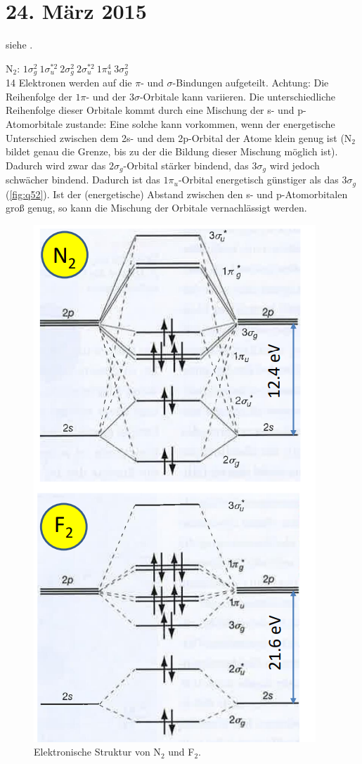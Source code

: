 \section{24. März 2015}

\label{q:51}

siehe .

\label{q:52}

N$_2$: $1\sigma_g^2 ~ 1\sigma_u^{*2} ~ 2\sigma_g^2 ~ 2\sigma_u^{*2} ~ 1\pi_u^4 ~ 3\sigma_g^2$ \\
14 Elektronen werden auf die $\pi$- und $\sigma$-Bindungen aufgeteilt. Achtung: Die Reihenfolge der $1\pi$- und der $3\sigma$-Orbitale kann variieren. Die unterschiedliche Reihenfolge dieser Orbitale kommt durch eine Mischung der s- und p-Atomorbitale zustande: Eine solche kann vorkommen, wenn der energetische Unterschied zwischen dem 2s- und dem 2p-Orbital der Atome klein genug ist (N$_2$ bildet genau die Grenze, bis zu der die Bildung dieser Mischung möglich ist). Dadurch wird zwar das $2\sigma_g$-Orbital stärker bindend, das $3\sigma_g$ wird jedoch schwächer bindend. Dadurch ist das $1\pi_u$-Orbital energetisch günstiger als das $3\sigma_g$ (\autoref{fig:q52}). Ist der (energetische) Abstand zwischen den s- und p-Atomorbitalen groß genug, so kann die Mischung der Orbitale vernachlässigt werden.

\begin{figure}[H]  
    \centering
    \includegraphics[width=.4\textwidth]{resources/24-03-2015/N2-F2.png}
    \caption{Elektronische Struktur von N$_2$ und F$_2$.}
    \label{fig:q52}
\end{figure}


